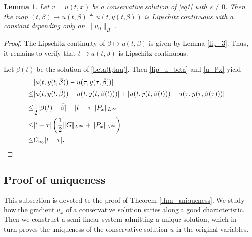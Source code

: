 \documentclass[10pt]{article}
\newtheorem{lemm}[theo]{Lemma}
\numberwithin{equation}{section}
\begin{document}
	\begin{lemm}\label{lip_4}
		Let $u=u(t,x)$ be a conservative solution of \eqref{eq1} with $s\neq0$. Then the map $(t,\beta)\mapsto u(t,\beta)\triangleq u(t,y(t,\beta))$ is Lipschitz continuous with a constant depending only on $\|u_0\|_{H^1}$.
	\end{lemm}
	\begin{proof}
		The Lipschitz continuity of $\beta\mapsto u(t,\beta)$ is given by Lemma \ref{lip_3}. Thus, it remains to verify that $t\mapsto u(t,\beta)$ is Lipschitz continuous.
		
		Let $\beta(t)$ be the solution of \eqref{beta(t;tau)}. Then \eqref{lip_u_beta} and \eqref{u_Px} yield
		\begin{align*}
			&|u(t,y(t,\bar{\beta}))-u(\tau,y(\tau,\bar{\beta}))| \\
			\leq&|u(t,y(t,\bar{\beta}))-u(t,y(t,\beta(t)))|+|u(t,y(t,\beta(t)))-u(\tau,y(\tau,\beta(\tau)))| \\
			\leq&\frac{1}{2}|\beta(t)-\bar{\beta}|+|t-\tau|\|P_{x}\|_{L^{\infty}} \\
			\leq&|t-\tau|\left(\frac{1}{2}\|G\|_{L^{\infty}}+\|P_{x}\|_{L^{\infty}}\right)\\
			\leq& C_{u_0}|t-\tau|.\qedhere
		\end{align*}
	\end{proof}	
	
	\subsection{Proof of uniqueness}
	This subsection is devoted to the proof of Theorem \ref{thm_uniqueness}. We study how the gradient $u_x$ of a conservative solution varies along a good characteristic. Then we construct a semi-linear system admitting a unique solution, which in turn proves the uniqueness of the conservative solution $u$ in the original variables.
	
\end{document}
